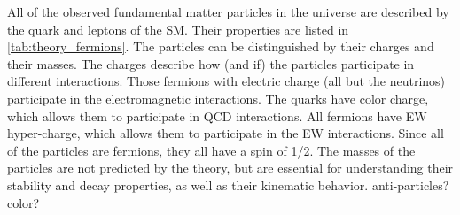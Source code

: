 All of the 
observed fundamental 
matter particles in the universe are described by the quark
and leptons of the SM. Their properties are listed 
in \tab\ref{tab:theory_fermions}. 
The particles can be distinguished
by their charges and their masses.
The charges describe how (and if) the particles participate in
different interactions.
Those fermions with electric charge (all but the neutrinos) 
participate in the electromagnetic
interactions. The quarks have color charge, which allows them to 
participate in QCD interactions. All fermions have EW hyper-charge, 
which allows them to participate in the EW interactions. %
Since all of the particles are fermions, they all have a spin of 1/2.
The masses of the particles are not predicted by the theory, but 
are essential for understanding their stability and decay properties,
as well as their kinematic behavior.
anti-particles? color?

